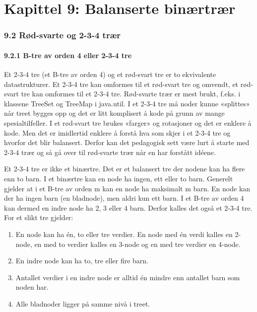 \documentclass[11pt]{article}
\begin{document}
\newpage
\part{Kapittel 9: Balanserte binærtrær}

\section{9.2 Rød-svarte og 2-3-4 trær}
    \subsection{9.2.1 B-tre av orden 4 eller 2-3-4 tre}
        Et 2-3-4 tre (et B-tre av orden 4) og et rød-svart tre er to ekvivalente datastrukturer. Et
        2-3-4 tre kan omformes til et rød-svart tre og omvendt, et rød-svart tre kan omformes til et
        2-3-4 tre. Rød-svarte trær er mest brukt, f.eks. i klassene TreeSet og TreeMap i java.util. I
        et 2-3-4 tre må noder kunne «splittes» når treet bygges opp og det er litt komplisert å kode
        på grunn av mange spesialtilfeller. I et rød-svart tre brukes «farger» og rotasjoner og det er
        enklere å kode. Men det er imidlertid enklere å forstå hva som skjer i et 2-3-4 tre og hvorfor
        det blir balansert. Derfor kan det pedagogisk sett være lurt å starte med 2-3-4 trær og så gå
        over til rød-svarte trær når en har forstått idéene.

        Et 2-3-4 tre er ikke et binærtre. Det er et balansert tre der nodene kan ha flere enn to barn. I
        et binærtre kan en node ha ingen, ett eller to barn. Generelt gjelder at i et B-tre av orden m
        kan en node ha maksimalt m barn. En node kan der ha ingen barn (en bladnode), men aldri
        kun ett barn. I et B-tre av orden 4 kan dermed en indre node ha 2, 3 eller 4 barn. Derfor
        kalles det også et 2-3-4 tre. For et slikt tre gjelder:
        \begin{enumerate}
            \item En node kan ha én, to eller tre verdier. En node med én verdi kalles en 2-node, en med
                  to verdier kalles en 3-node og en med tre verdier en 4-node.
            \item En indre node kan ha to, tre eller fire barn.
            \item Antallet verdier i en indre node er alltid én mindre enn antallet barn som noden har.
            \item Alle bladnoder ligger på samme nivå i treet.
        \end{enumerate}
\end{document}
